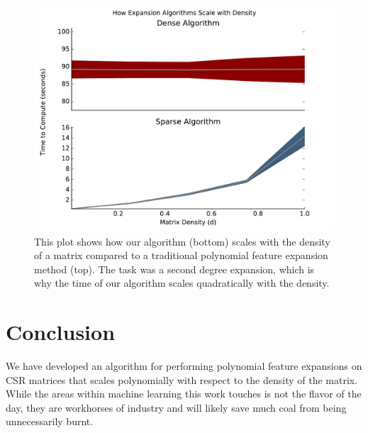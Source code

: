 \documentclass{article} %
\begin{document}
\begin{figure}[H]
    \centering
    \includegraphics[scale=0.6]{density_vs_time}
    \caption{This plot shows how our algorithm (bottom) scales with the density of a matrix compared to a traditional polynomial feature expansion method (top).
             The task was a second degree expansion, which is why the time of our algorithm scales quadratically with the density.}
    \label{fig:benchmark}
\end{figure}

\section{Conclusion}
We have developed an algorithm for performing polynomial feature expansions on CSR matrices that scales polynomially with respect to the density of the matrix.
While the areas within machine learning this work touches is not the flavor of the day, they are workhorses of industry and will likely save much coal from being unnecessarily burnt.



\end{document}
